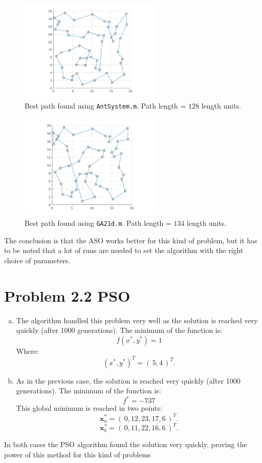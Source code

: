 \documentclass[18pt,a4paper]{article}
\begin{document}
\begin{enumerate}[a)]
\newpage

	\begin{figure}[h]
		\centering
		\includegraphics[width=0.6\textwidth]{PT128.png}
		\caption{\label{fig:2} Best path found using {\tt AntSystem.m}. Path length = $128$ length units.}
	\end{figure}

	\begin{figure}[h]
		\centering
		\includegraphics[width=0.6\textwidth]{21d13468.png}
		\caption{\label{fig:3} Best path found using {\tt GA21d.m}. Path length = $134$ length units.}
	\end{figure}
	
	The conclusion is that the ASO works better for this kind of problem, but it has to be noted that a lot of runs are needed to set the algorithm with the right choice of parameters.
	
\end{enumerate}

\newpage

\section*{Problem 2.2 PSO}
	\begin{enumerate}[a)]

		\item The algorithm handled this problem very well as the solution is reached very quickly (after 1000 generations). The minimum of the function is: 
		$$f(x^*,y^*) = 1$$
		Where:
		$$(x^*, y^*)^T = (\,5,4\,)^T.$$
				
		\item As in the previous case, the solution is reached very quickly (after 1000 generations). The minimum of the function is: 
		$$f^* = -737$$
		This global minimum is reached in two points:
		$${\mathbf x^*_a} = (\,0, 12, 23, 17, 6\,)^T.$$
		$${\mathbf x^*_b} = (\,0, 11, 22, 16, 6\,)^T.$$
		
	\end{enumerate}
	
	In both cases the PSO algorithm found the solution very quickly, proving the power of this method for this kind of problems
	
\end{document}
